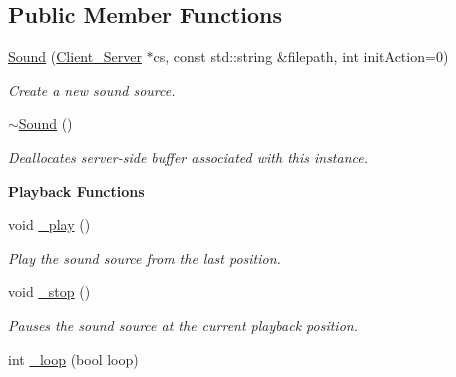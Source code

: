 \subsection*{Public Member Functions}
\begin{DoxyCompactItemize}
\item 
\hypertarget{classColliderPlusPlus_1_1Sound_a23a0354075aceeddb8ea4bf69631e4f8}{\hyperlink{classColliderPlusPlus_1_1Sound_a23a0354075aceeddb8ea4bf69631e4f8}{Sound} (\hyperlink{classColliderPlusPlus_1_1Client__Server}{Client\-\_\-\-Server} $\ast$cs, const std\-::string \&filepath, int init\-Action=0)}\label{classColliderPlusPlus_1_1Sound_a23a0354075aceeddb8ea4bf69631e4f8}

\begin{DoxyCompactList}\small\item\em Create a new sound source. \end{DoxyCompactList}\item 
\hypertarget{classColliderPlusPlus_1_1Sound_a0ae9f80837e343e016952def28815072}{\hyperlink{classColliderPlusPlus_1_1Sound_a0ae9f80837e343e016952def28815072}{$\sim$\-Sound} ()}\label{classColliderPlusPlus_1_1Sound_a0ae9f80837e343e016952def28815072}

\begin{DoxyCompactList}\small\item\em Deallocates server-\/side buffer associated with this instance. \end{DoxyCompactList}\end{DoxyCompactItemize}
\begin{Indent}{\bf Playback Functions}\par
\begin{DoxyCompactItemize}
\item 
\hypertarget{classColliderPlusPlus_1_1Sound_a0dacdc770784bcef22c99d9c927487c2}{void \hyperlink{classColliderPlusPlus_1_1Sound_a0dacdc770784bcef22c99d9c927487c2}{\-\_\-play} ()}\label{classColliderPlusPlus_1_1Sound_a0dacdc770784bcef22c99d9c927487c2}

\begin{DoxyCompactList}\small\item\em Play the sound source from the last position. \end{DoxyCompactList}\item 
\hypertarget{classColliderPlusPlus_1_1Sound_a799d86cf5a3e1fa9cdde8882658405db}{void \hyperlink{classColliderPlusPlus_1_1Sound_a799d86cf5a3e1fa9cdde8882658405db}{\-\_\-stop} ()}\label{classColliderPlusPlus_1_1Sound_a799d86cf5a3e1fa9cdde8882658405db}

\begin{DoxyCompactList}\small\item\em Pauses the sound source at the current playback position. \end{DoxyCompactList}\item 
int \hyperlink{classColliderPlusPlus_1_1Sound_abdbe1ade10accf84a92c4b1e77fe84ae}{\-\_\-loop} (bool loop)
\end{DoxyCompactItemize}
\end{Indent}



